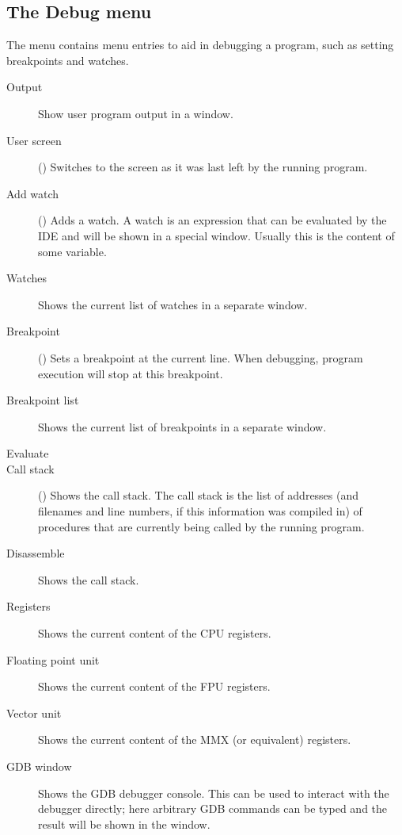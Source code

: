 \subsection{The Debug menu}
\label{se:menudebug}
The  menu contains menu entries to aid in debugging a program, such as
setting breakpoints and watches.
\begin{description}
\item[Output] Show user program output in a window.
\item[User screen] ()
Switches to the screen as it was last left by the running program.
\item[Add watch] () Adds a watch. A watch is an expression
that can be evaluated by the IDE and will be shown in a special window.
Usually this is the content of some variable.
\item[Watches]
Shows the current list of watches in a separate window.
\item[Breakpoint] ()
Sets a breakpoint at the current line. When debugging, program execution
will stop at this breakpoint.
\item[Breakpoint list]
Shows the current list of breakpoints in a separate window.
\item[Evaluate]
\item[Call stack] ()
Shows the call stack. The call stack is the list of addresses (and
filenames and line numbers, if this information was compiled in) of
procedures that are currently being called by the running program.
\item[Disassemble] Shows the call stack.
\item[Registers]
Shows the current content of the CPU registers.
\item[Floating point unit] 
Shows the current content of the FPU registers.
\item[Vector unit]
Shows the current content of the MMX (or equivalent) registers.
\item[GDB window]
Shows the GDB debugger console. This can be used to interact with the debugger
directly; here arbitrary GDB commands can be typed and the result will be
shown in the window.
\end{description}
%
%
